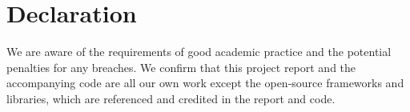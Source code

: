 \chapter*{Declaration}
We are aware of the requirements of good academic practice and the potential penalties for any breaches. We confirm that this project report and the accompanying code are all our own work except the open-source frameworks and libraries, which are referenced and credited in the report and code.

